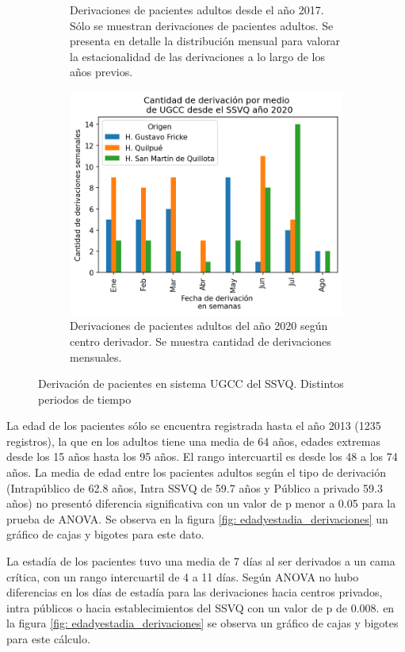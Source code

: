 \documentclass{article}
\begin{document}
\begin{figure}[p]
\begin{subfigure}{.5\textwidth}
		\caption{Derivaciones de pacientes adultos desde el año 2017. Sólo se muestran derivaciones de pacientes adultos. Se presenta en detalle la distribución mensual para valorar la estacionalidad de las derivaciones a lo largo de los años previos.}
	\end{subfigure}
	\centering
	\begin{subfigure}{.5\textwidth}
		\centering
		\includegraphics[width=.8\linewidth]{./figuras/Derivaciones2020.png}
		\caption{Derivaciones de pacientes adultos del año 2020 según centro derivador. Se muestra cantidad de derivaciones mensuales.}
	\end{subfigure}
	\caption{Derivación de pacientes en sistema UGCC del SSVQ. Distintos periodos de tiempo}
	\label{fig: derivacionesUGCC}
\end{figure}


La edad de los pacientes sólo se encuentra registrada hasta el año 2013 (1235 registros), la que en los adultos tiene una media de 64 años, edades extremas desde los 15 años hasta los 95 años. El rango intercuartil es desde los 48 a los 74 años.  La media de edad entre los pacientes adultos según el tipo de derivación (Intrapúblico de 62.8 años, Intra SSVQ de 59.7 años y Público a privado 59.3 años) no presentó diferencia significativa con un valor de p menor a 0.05 para la prueba de ANOVA. Se observa en la figura \ref{fig: edadyestadia_derivaciones} un gráfico de cajas y bigotes para este dato.

La estadía de los pacientes tuvo una media de 7 días al ser derivados a un cama crítica, con un rango intercuartil de 4 a 11 días. Según ANOVA no hubo diferencias en los días de estadía para las derivaciones hacia centros privados, intra públicos o hacia establecimientos del SSVQ con un valor de p de 0.008. en la figura \ref{fig: edadyestadia_derivaciones} se observa un gráfico de cajas y bigotes para este cálculo.
\end{document}
